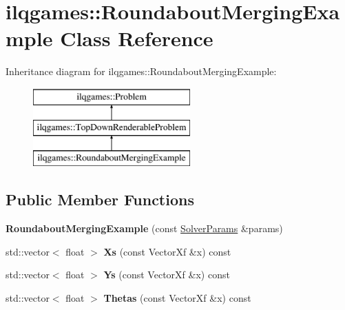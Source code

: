 \hypertarget{classilqgames_1_1_roundabout_merging_example}{}\section{ilqgames\+:\+:Roundabout\+Merging\+Example Class Reference}
\label{classilqgames_1_1_roundabout_merging_example}
Inheritance diagram for ilqgames\+:\+:Roundabout\+Merging\+Example\+:\begin{figure}[H]
\begin{center}
\leavevmode
\includegraphics[height=3.000000cm]{classilqgames_1_1_roundabout_merging_example}
\end{center}
\end{figure}
\subsection*{Public Member Functions}
\begin{DoxyCompactItemize}
\item 
{\bfseries Roundabout\+Merging\+Example} (const \hyperlink{structilqgames_1_1_solver_params}{Solver\+Params} \&params)\hypertarget{classilqgames_1_1_roundabout_merging_example_a9a36e72c360e99825bccf1de9ad54cef}{}\label{classilqgames_1_1_roundabout_merging_example_a9a36e72c360e99825bccf1de9ad54cef}

\item 
std\+::vector$<$ float $>$ {\bfseries Xs} (const Vector\+Xf \&x) const \hypertarget{classilqgames_1_1_roundabout_merging_example_adbe4b0b31b690b4a6bea6a5677f2db3f}{}\label{classilqgames_1_1_roundabout_merging_example_adbe4b0b31b690b4a6bea6a5677f2db3f}

\item 
std\+::vector$<$ float $>$ {\bfseries Ys} (const Vector\+Xf \&x) const \hypertarget{classilqgames_1_1_roundabout_merging_example_ab2f826a33b86e86199327f78f7572245}{}\label{classilqgames_1_1_roundabout_merging_example_ab2f826a33b86e86199327f78f7572245}

\item 
std\+::vector$<$ float $>$ {\bfseries Thetas} (const Vector\+Xf \&x) const \hypertarget{classilqgames_1_1_roundabout_merging_example_a3f8e894816106634504dd2d2e75cc73a}{}\label{classilqgames_1_1_roundabout_merging_example_a3f8e894816106634504dd2d2e75cc73a}

\end{DoxyCompactItemize}
